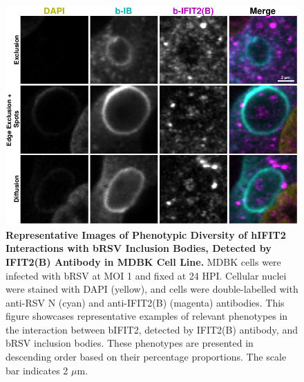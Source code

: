 \begin{figure}
    \centering
    \includegraphics[width=1\linewidth]{08. Chapter 3/Figs/02. Infection/02. IFIT2/02. IFIT2B/12. i2b mdbk brsv.pdf} 
    \caption[Representative Images of Phenotypic Diversity of hIFIT2 Interactions with bRSV Inclusion Bodies, Detected by IFIT2(B) Antibody in MDBK Cell Line.]{\textbf{Representative Images of Phenotypic Diversity of hIFIT2 Interactions with bRSV Inclusion Bodies, Detected by IFIT2(B) Antibody in MDBK Cell Line.} MDBK cells were infected with bRSV at MOI 1 and fixed at 24 HPI. Cellular nuclei were stained with DAPI (yellow), and cells were double-labelled with anti-RSV N (cyan) and anti-IFIT2(B) (magenta) antibodies. This figure showcases representative examples of relevant phenotypes in the interaction between bIFIT2, detected by IFIT2(B) antibody, and bRSV inclusion bodies. These phenotypes are presented in descending order based on their percentage proportions. The scale bar indicates 2 \(\mu \mbox{m}\).}
    \label{fig:Representative Images of Phenotypic Diversity of hIFIT2 Interactions with bRSV Inclusion Bodies, Detected by IFIT2(B) Antibody in MDBK Cell Line}
\end{figure}

